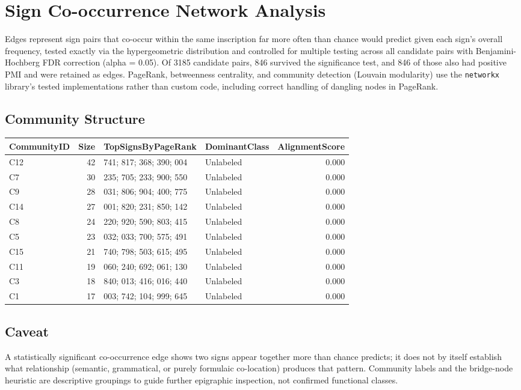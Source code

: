 \section{Sign Co-occurrence Network Analysis}

Edges represent sign pairs that co-occur within the same inscription far more
often than chance would predict given each sign's overall frequency, tested
exactly via the hypergeometric distribution and controlled for multiple
testing across all candidate pairs with Benjamini-Hochberg FDR correction
(alpha = 0.05). Of 3185 candidate pairs, 846 survived
the significance test, and 846 of those also had positive PMI and were
retained as edges. PageRank, betweenness centrality, and community detection
(Louvain modularity) use the \texttt{networkx} library's tested
implementations rather than custom code, including correct handling of
dangling nodes in PageRank.

\subsection{Community Structure}
\begin{tabular}{lrp{}lr}
\toprule
\textbf{CommunityID} & \textbf{Size} & \textbf{TopSignsByPageRank} & \textbf{DominantClass} & \textbf{AlignmentScore} \\
\midrule
C12 & 42 & 741; 817; 368; 390; 004 & Unlabeled & 0.000 \\
C7 & 30 & 235; 705; 233; 900; 550 & Unlabeled & 0.000 \\
C9 & 28 & 031; 806; 904; 400; 775 & Unlabeled & 0.000 \\
C14 & 27 & 001; 820; 231; 850; 142 & Unlabeled & 0.000 \\
C8 & 24 & 220; 920; 590; 803; 415 & Unlabeled & 0.000 \\
C5 & 23 & 032; 033; 700; 575; 491 & Unlabeled & 0.000 \\
C15 & 21 & 740; 798; 503; 615; 495 & Unlabeled & 0.000 \\
C11 & 19 & 060; 240; 692; 061; 130 & Unlabeled & 0.000 \\
C3 & 18 & 840; 013; 416; 016; 440 & Unlabeled & 0.000 \\
C1 & 17 & 003; 742; 104; 999; 645 & Unlabeled & 0.000 \\
\bottomrule
\end{tabular}

\subsection*{Caveat}
A statistically significant co-occurrence edge shows two signs appear
together more than chance predicts; it does not by itself establish what
relationship (semantic, grammatical, or purely formulaic co-location) produces
that pattern. Community labels and the bridge-node heuristic are descriptive
groupings to guide further epigraphic inspection, not confirmed functional
classes.
